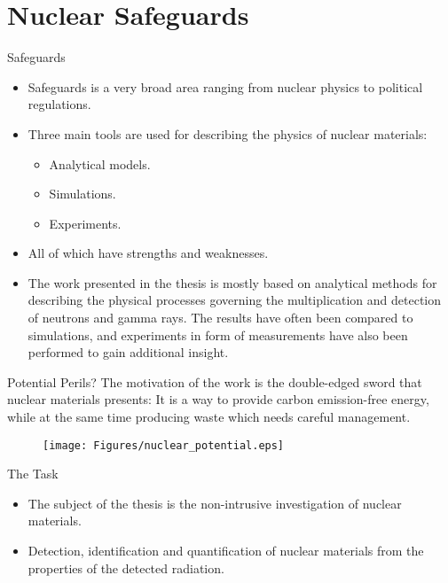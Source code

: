 \documentclass[clock,style=horatio,paper=screen,blackslide,trans=Wipe,mode=present]{powerdot}
\begin{document}
\section[slide=false]{Nuclear Safeguards}

\begin{slide}{Safeguards}
\begin{itemize}
    \item Safeguards is a very broad area ranging from nuclear
        physics to political regulations.

    \item Three main tools are used for describing the physics
        of nuclear materials:
        \begin{itemize}
            \item Analytical models.
            \item Simulations.
            \item Experiments.
        \end{itemize}
    \item All of which have strengths and weaknesses.

    \item The work presented in the thesis is mostly based on
        analytical methods for describing the physical
        processes governing the multiplication and detection
        of neutrons and gamma rays. The results have often
        been compared to simulations, and experiments in form
        of measurements have also been performed to gain
        additional insight.
\end{itemize}
\end{slide}


\begin{slide}[toc=]{Potential Perils?}
The motivation of the work is the double-edged sword that nuclear
materials presents: It is a way to provide carbon emission-free
energy, while at the same time producing waste which needs careful
management.
\begin{figure}[H]
\centering
\texttt{[image: Figures/nuclear\_potential.eps]}
\end{figure}
\end{slide}

\begin{slide}[toc=]{The Task}
\vspace{6mm}
\begin{itemize}
    \item The subject of the thesis is the non-intrusive investigation of nuclear materials. \\[6mm]

    \item Detection, identification and quantification of
        nuclear materials from the properties of the detected
        radiation.
\end{itemize}
\end{slide}
\end{document}

